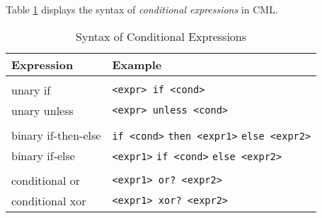 Table \ref{tab:conditional-expr-syntax} displays
the syntax of \emph{conditional expressions} in CML.

\begin{table}[H]
\centering
\begin{tabular}
{ l l }
\hline
Expression & Example \\
\hline
\\
unary if & \verb|<expr> if <cond>| \\
unary unless & \verb|<expr> unless <cond>| \\
\\
binary if-then-else & \verb|if <cond>| \verb|then <expr1>| \verb|else <expr2>| \\
binary if-else & \verb|<expr1>| \verb|if <cond>| \verb|else <expr2>| \\
\\
conditional or & \verb|<expr1> or? <expr2>| \\
conditional xor & \verb|<expr1> xor? <expr2>| \\
\end{tabular}
\caption{Syntax of Conditional Expressions}
\label{tab:conditional-expr-syntax}
\end{table}
